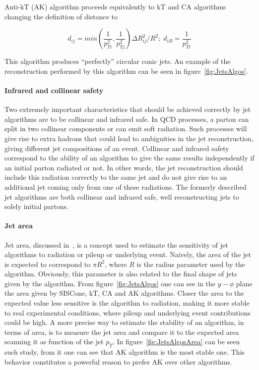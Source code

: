 Anti-kT (AK) algorithm proceeds equivalently to kT and CA algorithms changing the definition of distance to

\begin{equation}
  \label{eq:antikt}
  d_{ij}=min\left(\frac{1}{p_{Ti}^{2}},\frac{1}{p_{Tj}^{2}}\right)\Delta R_{ij}^{2}/R^{2};\; d_{iB}=\frac{1}{p_{Ti}^{2}}
\end{equation} 

This algorithm produces ``perfectly'' circular conic jets. An example of the reconstruction performed by this algorithm can be seen in figure~\ref{fig:JetsAlgos}.

\paragraph{Infrared and collinear safety}

Two extremely important characteristics that should be achieved correctly by jet algorithms are to be collinear and infrared safe. In QCD processes, a parton can split in two collinear components or can emit soft radiation. Such processes will give rise to extra hadrons that could lead to ambiguities in the jet reconstruction, giving different jet compositions of an event. Collinear and infrared safety correspond to the ability of an algorithm to give the same results independently if an initial parton radiated or not. In other words, the jet reconstruction should include this radiation correctly to the same jet and do not give rise to an additional jet coming only from one of these radiations. The formerly described jet algorithms are both collinear and infrared safe, well reconstructing jets to solely initial partons. 

\paragraph{Jet area}

Jet area, discussed in~\cite{Cacciari:2008gn}, is a concept used to estimate the sensitivity of jet algorithms to radiation or pileup or underlying event. Naively, the area of the jet is expected to correspond to $\pi R^{2}$, where $R$ is the radius parameter used by the algorithm. Obviously, this parameter is also related to the final shape of jets given by the algorithm. From figure~\ref{fig:JetsAlgos} one can see in the $y-\phi$ plane the area given by SISCone, kT, CA and AK algorithms. Closer the area to the expected value less sensitive is the algorithm to radiation, making it more stable to real experimental conditions, where pileup and underlying event contributions could be high. A more precise way to estimate the stability of an algorithm, in terms of area, is to measure the jet area and compare it to the expected area scanning it as function of the jet $p_{T}$. In figure~\ref{fig:JetsAlgosArea} can be seen such study, from it one can see that AK algorithm is the most stable one. This behavior constitutes a powerful reason to prefer AK over other algorithms. 

